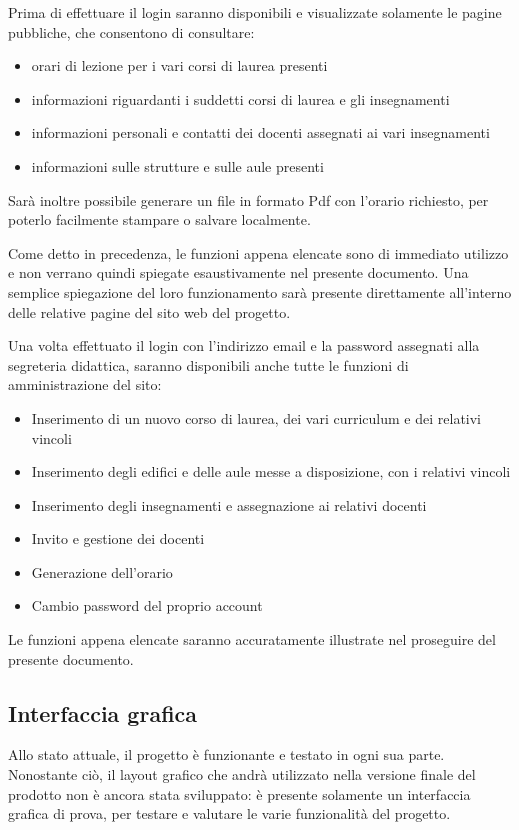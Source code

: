\documentclass[11pt,a4paper]{article}
\begin{document}
Prima di effettuare il login saranno disponibili e visualizzate solamente le pagine pubbliche, che consentono di consultare:
\begin{itemize}
 \item orari di lezione per i vari corsi di laurea presenti
 \item informazioni riguardanti i suddetti corsi di laurea e gli insegnamenti
 \item informazioni personali e contatti dei docenti assegnati ai vari insegnamenti
 \item informazioni sulle strutture e sulle aule presenti
\end{itemize}
Sarà inoltre possibile generare un file in formato Pdf con l'orario richiesto, per poterlo facilmente stampare o salvare localmente.

Come detto in precedenza, le funzioni appena elencate sono di immediato utilizzo e non verrano quindi spiegate esaustivamente nel presente documento.
Una semplice spiegazione del loro funzionamento sarà presente direttamente all'interno delle relative pagine del sito web del progetto.

\bigskip
Una volta effettuato il login con l'indirizzo email e la password assegnati alla segreteria didattica, saranno disponibili anche tutte le funzioni di amministrazione del sito:
\begin{itemize}
 \item Inserimento di un nuovo corso di laurea, dei vari curriculum e dei relativi vincoli
 \item Inserimento degli edifici e delle aule messe a disposizione, con i relativi vincoli
 \item Inserimento degli insegnamenti e assegnazione ai relativi docenti
 \item Invito e gestione dei docenti
 \item Generazione dell'orario
 \item Cambio password del proprio account
\end{itemize}
Le funzioni appena elencate saranno accuratamente illustrate nel proseguire del presente documento.
\subsection{Interfaccia grafica}
Allo stato attuale, il progetto è funzionante e testato in ogni sua parte.
Nonostante ciò, il layout grafico che andrà utilizzato nella versione finale del prodotto non è ancora stata sviluppato: è presente solamente un interfaccia grafica di prova, per testare e valutare le varie funzionalità del progetto.
\end{document}

